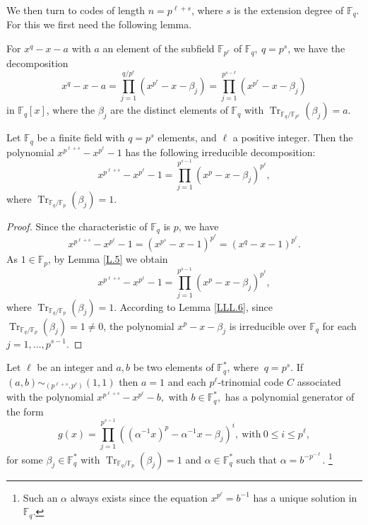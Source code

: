 \documentclass[12pt]{elsarticle}
\newcommand{\Fq}{\mathbb{F}_{q}}
\DeclareMathOperator{\Tr}{Tr}
\theoremstyle{break}
{\theorembodyfont{\upshape}
    \newtheorem{theorem}{Theorem}[section] %
    \newtheorem{lemma}[theorem]{Lemma} %
    \newtheorem{proposition}[theorem]{Proposition}
    \newtheorem{corollary}[theorem]{Corollary}
    \newtheorem{definition}[theorem]{Definition}
    \newtheorem{example}[theorem]{Example}
    \newtheorem{remark}[theorem]{Remark}
    \newtheorem{conjecture}[theorem]{Conjecture}
    \newtheorem*{proof}{{Proof}}
	\newtheorem*{notation}{Notation}
	\newtheorem*{main}{Cain Theorem}
	\newtheorem*{problem}{Problem}
}
\begin{document}
We then turn to codes of length $n=p^{\ell+s}$, where $s$ is the extension degree of $\Fq$. For this we first need the following lemma.

\begin{lemma}\cite[Theorem. 3.80.]{Lidl1987}\label{L.5}
 For $x^q-x-a$ with $a$  an element of the subfield $\mathbb{F}_{p^r}$ of $\mathbb{F}_q, \ q=p^s$, we have the decomposition
$$
x^q-x-a= \prod_{j=1}^{q/p^r}\left(x^{p^r}-x-\beta_j\right)=\prod_{j=1}^{p^{s-r}}\left(x^{p^r}-x-\beta_j\right)
$$
in $\mathbb{F}_q[x]$, where the $\beta_j$ are the distinct elements of $\mathbb{F}_q$ with $\Tr_{\Fq / \mathbb{F}_{p^r}}\left(\beta_j\right)=a$.
\end{lemma}

\begin{theorem}\label{CCor.4}
Let $\mathbb{F}_q$ be a finite field with $q = p^s$ elements, and  $\ell$  a positive integer. Then the polynomial $x^{p^{\ell+s}} - x^{p^{\ell}} - 1$ has the following irreducible decomposition:
$$
x^{p^{\ell+s}} - x^{p^{\ell}} - 1 = \prod_{j=1}^{p^{s-1}} \left( x^p - x - \beta_j \right)^{p^{\ell}},
$$
where $\operatorname{Tr}_{\mathbb{F}_q / \mathbb{F}_p}(\beta_j) = 1$.
\end{theorem}
\begin{proof}
Since the characteristic of $\mathbb{F}_q$ is $p$, we have
$$
x^{p^{\ell+s}} - x^{p^{\ell}} - 1 = \left( x^{p^{s}} - x - 1 \right)^{p^{\ell}} = \left( x^q - x - 1 \right)^{p^{\ell}}.
$$
As $1 \in \mathbb{F}_p$, by Lemma \ref{L.5} we obtain
$$
x^{p^{\ell+s}} - x^{p^{\ell}} - 1 = \prod_{j=1}^{p^{s-1}} \left( x^p - x - \beta_j \right)^{p^{\ell}},
$$
where $\operatorname{Tr}_{\mathbb{F}_q / \mathbb{F}_p}(\beta_j) = 1$. According to Lemma \ref{LLL.6}, since $\operatorname{Tr}_{\mathbb{F}_q / \mathbb{F}_p}(\beta_j) = 1 \neq 0$, the polynomial $x^p - x - \beta_j$ is irreducible over $\mathbb{F}_q$ for each $j = 1, \ldots, p^{s-1}$.
\end{proof}


\begin{corollary}\label{Th.5}
Let $\ell$ be an integer and  $a, b$ be two elements of $\mathbb{F}_q^*$, where $\ q=p^s$. If $(a,b) \sim_{(p^{\ell+s},p^{\ell})}(1,1)$
then    $ a=1$ and   each  $p^{\ell}$-trinomial  code $C$  associated with the polynomial $x^{p^{\ell+s}}- x^{p^{\ell}}-b,$ with $b\in \Fq^{*},$ has a polynomial generator of the form 
$$ g(x)=  \prod_{j=1}^{p^{s-1}} \left( (\alpha^{-1} x)^{p}- \alpha^{-1} x-\beta_j \right)^{i}, \ \text{with} \ 0 \leq i\leq p^{\ell},  $$
for some $\beta_j\in \Fq^*$ with $\Tr_{\Fq/ \mathbb{F}_p}(\beta_j)= 1$ and  $\alpha\in \Fq^{*} $  such that   $ \alpha= b^{-p^{-\ell}}  .$
\footnote{Such an $\alpha$ always exists since the equation $ x^{p^{\ell}}=b^{-1}$ has a unique solution in $\Fq$. 
}
\end{corollary}
\end{document}
